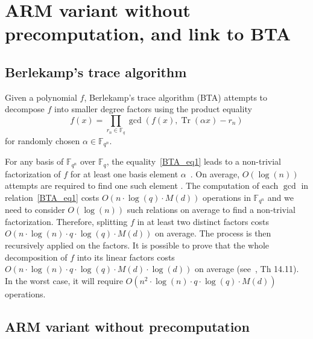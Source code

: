 \documentclass{sig-alternate}
\newcommand{\ff}[1]{\mathbb{F}_{#1}}
\newcommand{\fq}{\ff{q}}
\newcommand{\fqn}{\ff{q^n}}
\newcommand{\qq}{q}
\newcommand{\nn}{n}
\newcommand{\qn}{{\qq^\nn}}
\newcommand{\basef}{\ff{\qq}}
\newcommand{\extf}{\ff{\qn}}
\DeclareMathOperator{\Tr}{Tr}
\newcommand{\bigO}{O}
\newcounter{algo}
\newtheorem{Lem}{Lemma}
\begin{document}
\section{ARM variant without precomputation, and link to BTA}

\subsection{Berlekamp's trace algorithm}

Given a polynomial $f$, Berlekamp's trace algorithm (BTA) attempts to decompose $f$ into smaller degree factors using the product equality
\begin{equation}\label{BTA_eq1}
f(x)=\prod_{r_n\in\fq}\gcd\left(f(x),\Tr(\alpha x)-r_n\right)
\end{equation}
for randomly chosen $\alpha\in\fqn$.



%
For any basis of $\extf$ over $\basef$, the equality~\eqref{BTA_eq1} leads to a non-trivial factorization of $f$ for at least one basis element $\alpha$~\cite{berl70}.
% 
On average, $\bigO(\log(n))$ attempts are required to find one such element \cite{Menvanovans92}. The computation of each $\gcd$ in relation~\eqref{BTA_eq1} costs $\bigO(n \cdot \log(q) \cdot M(d))$ operations in $\extf$ and we need to consider $\bigO(\log(n))$ such relations on average to find a non-trivial factorization. Therefore, 
splitting $f$ in at least two distinct factors costs $\bigO(n \cdot \log(n) \cdot  q \cdot \log(q) \cdot M(d))$ on average. The process is then recursively applied on the factors. It is possible to prove that the whole decomposition of $f$ into its linear factors costs $\bigO(n  \cdot \log(n) \cdot q \cdot \log(q) \cdot M(d) \cdot \log(d))$ on average (see~\cite{Gathen2003}, Th 14.11). In the worst case, it will require $\bigO(n^2 \cdot \log(n) \cdot q \cdot \log(q) \cdot M(d) )$ operations.



\subsection{ARM variant without precomputation\label{sec:BTA:ARMvariant}}
\end{document}
